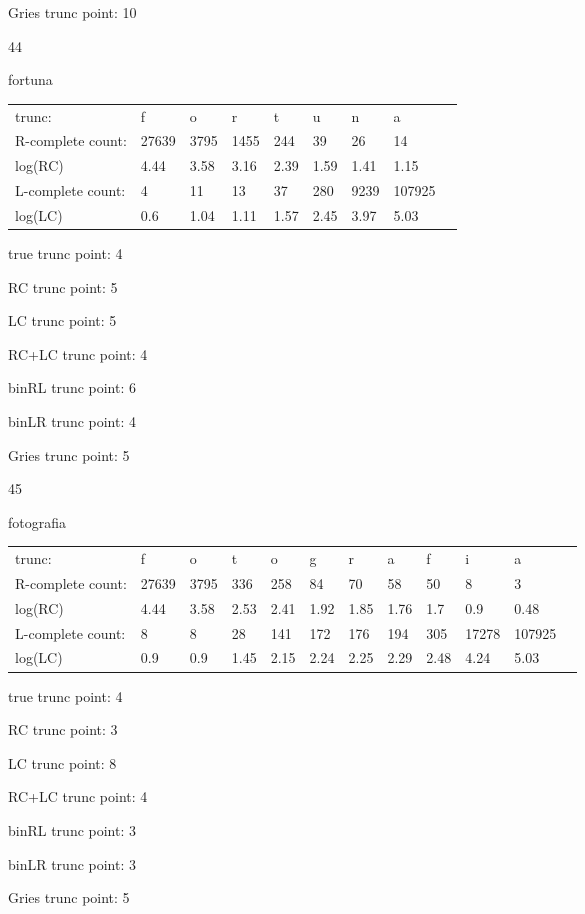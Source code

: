 \documentclass[10pt]{article}
\begin{document}
Gries trunc point: 10

\vspace{1em}

44

fortuna

\begin{tabular}{l|llllllll}
trunc: & f & o & r & t & u & n & a & \\ 
R-complete count: & 27639 & 3795 & 1455 & 244 & 39 & 26 & 14 & \\ 
log(RC) & 4.44 & 3.58 & 3.16 & 2.39 & 1.59 & 1.41 & 1.15 & \\ 
L-complete count: & 4 & 11 & 13 & 37 & 280 & 9239 & 107925 & \\ 
log(LC) & 0.6 & 1.04 & 1.11 & 1.57 & 2.45 & 3.97 & 5.03 & \\ 
\end{tabular}

true trunc point: 4

RC trunc point: 5

LC trunc point: 5

RC+LC trunc point: 4

binRL trunc point: 6

binLR trunc point: 4

Gries trunc point: 5

\newpage

45

fotografia

\begin{tabular}{l|lllllllllll}
trunc: & f & o & t & o & g & r & a & f & i & a & \\ 
R-complete count: & 27639 & 3795 & 336 & 258 & 84 & 70 & 58 & 50 & 8 & 3 & \\ 
log(RC) & 4.44 & 3.58 & 2.53 & 2.41 & 1.92 & 1.85 & 1.76 & 1.7 & 0.9 & 0.48 & \\ 
L-complete count: & 8 & 8 & 28 & 141 & 172 & 176 & 194 & 305 & 17278 & 107925 & \\ 
log(LC) & 0.9 & 0.9 & 1.45 & 2.15 & 2.24 & 2.25 & 2.29 & 2.48 & 4.24 & 5.03 & \\ 
\end{tabular}

true trunc point: 4

RC trunc point: 3

LC trunc point: 8

RC+LC trunc point: 4

binRL trunc point: 3

binLR trunc point: 3

Gries trunc point: 5
\end{document}
